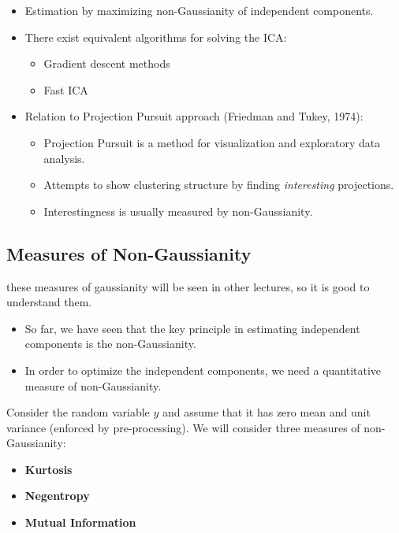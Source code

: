   \begin{itemize}
    \item Estimation by maximizing non-Gaussianity of independent components.            
    \item There exist equivalent algorithms for solving the ICA:
      \begin{itemize}
        \item Gradient descent methods
        \item Fast ICA
      \end{itemize}
                 
    \item Relation to Projection Pursuit approach (Friedman and Tukey, 1974):
      \begin{itemize}
        \item Projection Pursuit is a method for visualization and exploratory data analysis.
        \item Attempts to show clustering structure by finding \textit{interesting} projections.
        \item Interestingness is usually measured by non-Gaussianity.
      \end{itemize}
  \end{itemize}
 
\subsection{Measures of Non-Gaussianity}

these measures of gaussianity will be seen in other lectures, so it is good to understand them.  

  \begin{itemize}
    \item So far, we have seen that the key principle in estimating independent components is the non-Gaussianity.            
    \item In order to optimize the independent components, we need a quantitative measure of non-Gaussianity.
  \end{itemize}
 
  Consider the random variable $y$ and assume that it has zero mean and unit variance (enforced by pre-processing).  We will consider three measures of non-Gaussianity:

  \begin{itemize}
    \item\textbf        {Kurtosis}
    \item\textbf        {Negentropy}
    \item\textbf        {Mutual Information}
  \end{itemize}
          
